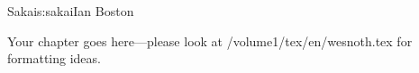 \begin{aosachapter}{Sakai}{s:sakai}{Ian Boston}

Your chapter goes here---please look at /volume1/tex/en/wesnoth.tex for 
formatting ideas.

\end{aosachapter}
